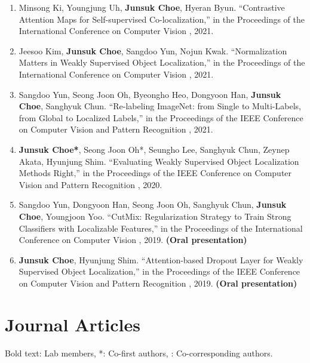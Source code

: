\documentclass[letterpaper,11pt]{article}
\begin{document}
\begin{enumerate}[itemsep=5.5pt]
    \item Minsong Ki, Youngjung Uh, \textbf{Junsuk Choe}, Hyeran Byun.
    ``Contrastive Attention Maps for Self-supervised Co-localization,''
    in the Proceedings of the International Conference on Computer Vision , 2021.

    \item Jeesoo Kim, \textbf{Junsuk Choe}, Sangdoo Yun, Nojun Kwak.
    ``Normalization Matters in Weakly Supervised Object Localization,''
    in the Proceedings of the International Conference on Computer Vision , 2021.

    \item Sangdoo Yun, Seong Joon Oh, Byeongho Heo, Dongyoon Han, \textbf{Junsuk Choe}, Sanghyuk Chun.
    ``Re-labeling ImageNet: from Single to Multi-Labels, from Global to Localized Labels,''
    in the Proceedings of the IEEE Conference on Computer Vision and Pattern Recognition , 2021.

    \item \textbf{Junsuk Choe*}, Seong Joon Oh*, Seungho Lee, Sanghyuk Chun, Zeynep Akata, Hyunjung Shim.
    ``Evaluating Weakly Supervised Object Localization Methods Right,''
    in the Proceedings of the IEEE Conference on Computer Vision and Pattern Recognition , 2020.

    \item Sangdoo Yun, Dongyoon Han, Seong Joon Oh, Sanghyuk Chun, \textbf{Junsuk Choe}, Youngjoon Yoo.
    ``CutMix: Regularization Strategy to Train Strong Classifiers with Localizable Features,''
    in the Proceedings of the International Conference on Computer Vision , 2019.
    \textbf{(Oral presentation)}

    \item \textbf{Junsuk Choe}, Hyunjung Shim.
    ``Attention-based Dropout Layer for Weakly Supervised Object Localization,''
    in the Proceedings of the IEEE Conference on Computer Vision and Pattern Recognition , 2019.
    \textbf{(Oral presentation)}

\end{enumerate}

\section{Journal Articles}
\small{Bold text: Lab members, *: Co-first authors, \textdagger: Co-corresponding authors.}
\end{document}
